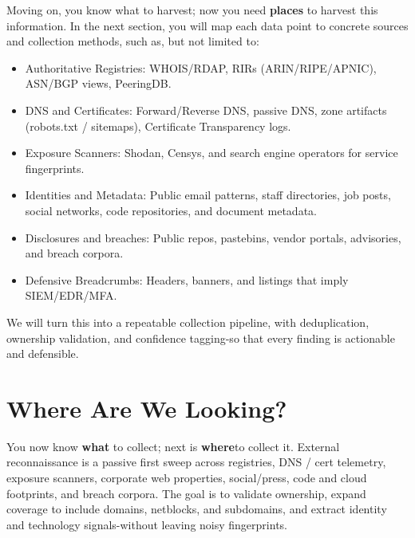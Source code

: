Moving on, you know what to harvest; now you need \textbf{ places} to harvest this information. In the next section, you will map each data point to concrete sources and collection methods, such as, but not limited to:
\begin{itemize}
    \item Authoritative Registries: WHOIS/RDAP, RIRs (ARIN/RIPE/APNIC), ASN/BGP views, PeeringDB.
    \item DNS and Certificates: Forward/Reverse DNS, passive DNS, zone artifacts (robots.txt / sitemaps), Certificate Transparency logs.
    \item Exposure Scanners: Shodan, Censys, and search engine operators for service fingerprints.
    \item Identities and Metadata: Public email patterns, staff directories, job posts, social networks, code repositories, and document metadata.
    \item Disclosures and breaches: Public repos, pastebins, vendor portals, advisories, and breach corpora.
    \item Defensive Breadcrumbs: Headers, banners, and listings that imply SIEM/EDR/MFA.
\end{itemize}

We will turn this into a repeatable collection pipeline, with deduplication, ownership validation, and confidence tagging-so that every finding is actionable and defensible.

\section{Where Are We Looking?}
You now know \textbf{what} to collect; next is \textbf{where}to collect it. External reconnaissance is a passive first sweep across registries, DNS / cert telemetry, exposure scanners, corporate web properties, social/press, code and cloud footprints, and breach corpora. The goal is to validate ownership, expand coverage to include domains, netblocks, and subdomains, and extract identity and technology signals-without leaving noisy fingerprints.


